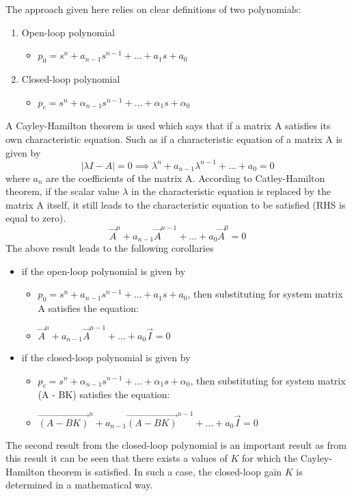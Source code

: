 The approach given here relies on clear definitions of two polynomials:
\begin{enumerate}
	\item Open-loop polynomial
	\begin{itemize}
		\item $p_0 = s^{n} + a_{n-1}s^{n-1} + ... + a_{1}s + a_{0}$
	\end{itemize}
	\item Closed-loop polynomial
	\begin{itemize}
		\item $p_c = s^{n} + \alpha_{n-1}s^{n-1} + ... + \alpha_{1}s + \alpha_{0}$
	\end{itemize}
\end{enumerate}
A Cayley-Hamilton theorem is used which says that if a matrix A satisfies its own characteristic equation. Such as if a characteristic equation of a matrix A is given by
\begin{equation}
	|\lambda I - A| = 0 \implies \lambda^{n} + a_{n-1}\lambda^{n-1} + ... + a_{0} = 0
\end{equation} 
where $a_n$ are the coefficients of the matrix A. According to Catley-Hamilton theorem, if the scalar value $\lambda$ in the characteristic equation is replaced by the matrix A itself, it still leads to the characteristic equation to be satisfied (RHS is equal to zero).
\begin{equation}
	\vec{A}^{n} + a_{n-1}\vec{A}^{n-1} + ... + a_{0}\vec{A}^{0} = 0
\end{equation}
The above result leads to the following corollaries
\begin{itemize}
	\item if the open-loop polynomial is given by
	\begin{itemize}
		\item $p_0 = s^{n} + a_{n-1}s^{n-1} + ... + a_{1}s + a_{0}$, then substituting for system matrix A satisfies the equation:
		\item $\vec{A}^{n} + a_{n-1}\vec{A}^{n-1} + ... + a_{0}\vec{I} = 0$
	\end{itemize}
	\item if the closed-loop polynomial is given by
	\begin{itemize}
		\item $p_c = s^{n} + \alpha_{n-1}s^{n-1} + ... + \alpha_{1}s + \alpha_{0}$, then substituting for system matrix (A - BK) satisfies the equation:
		\item $\vec{(A - BK)}^{n} + a_{n-1}\vec{(A - BK)}^{n-1} + ... + a_{0}\vec{I} = 0$
	\end{itemize}
\end{itemize}
The second result from the closed-loop polynomial is an important result as from this result it can be seen that there exists a values of $K$ for which the Cayley-Hamilton theorem is satisfied. In such a case, the closed-loop gain $K$ is determined in a mathematical way.

